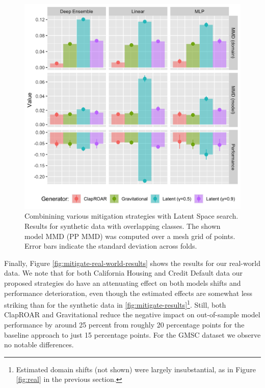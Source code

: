 \documentclass[conference,final,]{IEEEtran}
\theoremstyle{definition}
\theoremstyle{definition}
\theoremstyle{definition}
\theoremstyle{definition}
\theoremstyle{remark}
\begin{document}
\begin{figure}

{\centering \includegraphics[width=0.9\linewidth]{www/mitigation_synthetic_latent_results} 

}

\caption{Combinining various mitigation strategies with Latent Space search. Results for synthetic data with overlapping classes. The shown model MMD (PP MMD) was computed over a mesh grid of points. Error bars indicate the standard deviation across folds.}\label{fig:mitigate-latent-results}
\end{figure}

Finally, Figure \ref{fig:mitigate-real-world-results} shows the results for our real-world data. We note that for both California Housing and Credit Default data our proposed strategies do have an attenuating effect on both models shifts and performance deterioration, even though the estimated effects are somewhat less striking than for the synthetic data in \ref{fig:mitigate-results}\footnote{Estimated domain shifts (not shown) were largely insubstantial, as in Figure \ref{fig:real} in the previous section.}. Still, both ClapROAR and Gravitational reduce the negative impact on out-of-sample model performance by around 25 percent from roughly 20 percentage points for the baseline approach to just 15 percentage points. For the GMSC dataset we observe no notable differences.
\end{document}

